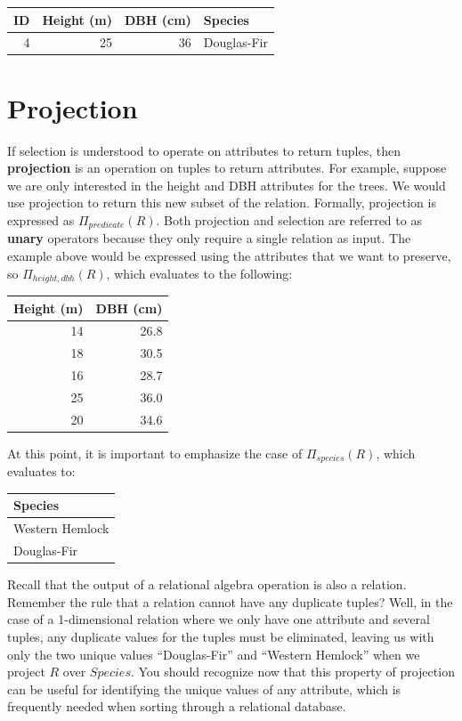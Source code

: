 \documentclass[
]{book}
\begin{document}
\begin{tabular}{rrrl}
\toprule
ID & Height (m) & DBH (cm) & Species\\
\midrule
4 & 25 & 36 & Douglas-Fir\\
\bottomrule
\end{tabular}

\hypertarget{projection}{%
\section{Projection}\label{projection}}

If selection is understood to operate on attributes to return tuples, then \textbf{projection} is an operation on tuples to return attributes. For example, suppose we are only interested in the height and DBH attributes for the trees. We would use projection to return this new subset of the relation. Formally, projection is expressed as \(Π_{predicate}(R)\). Both projection and selection are referred to as \textbf{unary} operators because they only require a single relation as input. The example above would be expressed using the attributes that we want to preserve, so \(Π_{height,dbh}(R)\), which evaluates to the following:

\begin{tabular}{rr}
\toprule
Height (m) & DBH (cm)\\
\midrule
14 & 26.8\\
18 & 30.5\\
16 & 28.7\\
25 & 36.0\\
20 & 34.6\\
\bottomrule
\end{tabular}

At this point, it is important to emphasize the case of \(Π_{species}(R)\), which evaluates to:

\begin{tabular}{l}
\toprule
Species\\
\midrule
Western Hemlock\\
Douglas-Fir\\
\bottomrule
\end{tabular}

Recall that the output of a relational algebra operation is also a relation. Remember the rule that a relation cannot have any duplicate tuples? Well, in the case of a 1-dimensional relation where we only have one attribute and several tuples, any duplicate values for the tuples must be eliminated, leaving us with only the two unique values ``Douglas-Fir'' and ``Western Hemlock'' when we project \(R\) over \(Species\). You should recognize now that this property of projection can be useful for identifying the unique values of any attribute, which is frequently needed when sorting through a relational database.
\end{document}
